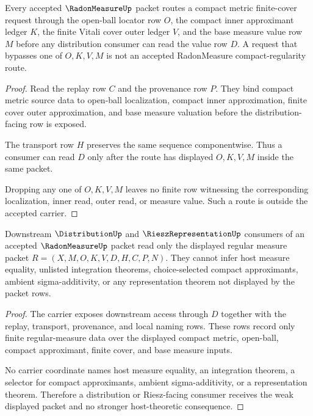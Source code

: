 \begin{theorem}
\label{thm:radon-measure-compact-regularity-route}
Every accepted $\RadonMeasureUp$ packet routes a compact metric finite-cover request through the open-ball locator row $O$, the compact inner approximant ledger $K$, the finite Vitali cover outer ledger $V$, and the base measure value row $M$ before any distribution consumer can read the value row $D$. A request that bypasses one of $O,K,V,M$ is not an accepted RadonMeasure compact-regularity route.
\end{theorem}
\begin{proof}
Read the replay row $C$ and the provenance row $P$. They bind compact metric source data to open-ball localization, compact inner approximation, finite cover outer approximation, and base measure valuation before the distribution-facing row is exposed.

The transport row $H$ preserves the same sequence componentwise. Thus a consumer can read $D$ only after the route has displayed $O,K,V,M$ inside the same packet.

Dropping any one of $O,K,V,M$ leaves no finite row witnessing the corresponding localization, inner read, outer read, or measure value. Such a route is outside the accepted carrier.
\end{proof}

\begin{theorem}
\label{thm:radon-measure-weak-consumer-boundary}
Downstream $\DistributionUp$ and $\RieszRepresentationUp$ consumers of an accepted $\RadonMeasureUp$ packet read only the displayed regular measure packet $R=(X,M,O,K,V,D,H,C,P,N)$. They cannot infer host measure equality, unlisted integration theorems, choice-selected compact approximants, ambient sigma-additivity, or any representation theorem not displayed by the packet rows.
\end{theorem}
\begin{proof}
The carrier exposes downstream access through $D$ together with the replay, transport, provenance, and local naming rows. These rows record only finite regular-measure data over the displayed compact metric, open-ball, compact approximant, finite cover, and base measure inputs.

No carrier coordinate names host measure equality, an integration theorem, a selector for compact approximants, ambient sigma-additivity, or a representation theorem. Therefore a distribution or Riesz-facing consumer receives the weak displayed packet and no stronger host-theoretic consequence.
\end{proof}

